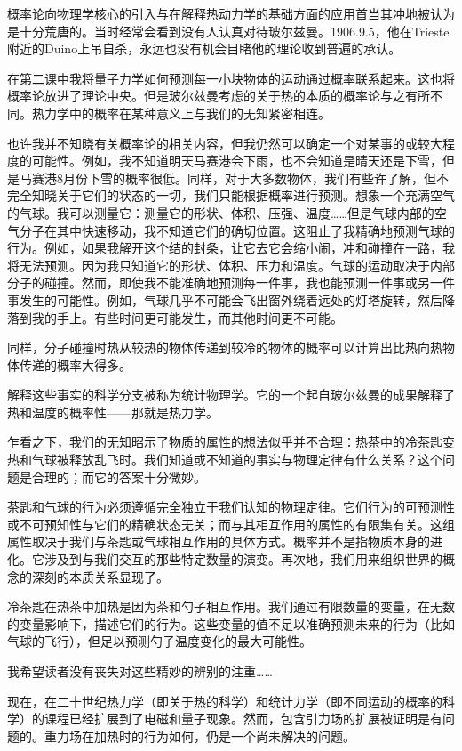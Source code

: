    概率论向物理学核心的引入与在解释热动力学的基础方面的应用首当其冲地被认为是十分荒唐的。当时经常会看到没有人认真对待玻尔兹曼。1906.9.5，他在Trieste附近的Duino上吊自杀，永远也没有机会目睹他的理论收到普遍的承认。

   在第二课中我将量子力学如何预测每一小块物体的运动通过概率联系起来。这也将概率论放进了理论中央。但是玻尔兹曼考虑的关于热的本质的概率论与之有所不同。热力学中的概率在某种意义上与我们的无知紧密相连。

   也许我并不知晓有关概率论的相关内容，但我仍然可以确定一个对某事的或较大程度的可能性。例如，我不知道明天马赛港会下雨，也不会知道是晴天还是下雪，但是马赛港8月份下雪的概率很低。同样，对于大多数物体，我们有些许了解，但不完全知晓关于它们的状态的一切，我们只能根据概率进行预测。想象一个充满空气的气球。我可以测量它：测量它的形状、体积、压强、温度……但是气球内部的空气分子在其中快速移动，我不知道它们的确切位置。这阻止了我精确地预测气球的行为。例如，如果我解开这个结的封条，让它去它会缩小闹，冲和碰撞在一路，我将无法预测。因为我只知道它的形状、体积、压力和温度。气球的运动取决于内部分子的碰撞。然而，即使我不能准确地预测每一件事，我也能预测一件事或另一件事发生的可能性。例如，气球几乎不可能会飞出窗外绕着远处的灯塔旋转，然后降落到我的手上。有些时间更可能发生，而其他时间更不可能。

   同样，分子碰撞时热从较热的物体传递到较冷的物体的概率可以计算出比热向热物体传递的概率大得多。

   解释这些事实的科学分支被称为统计物理学。它的一个起自玻尔兹曼的成果解释了热和温度的概率性——那就是热力学。

   乍看之下，我们的无知昭示了物质的属性的想法似乎并不合理：热茶中的冷茶匙变热和气球被释放乱飞时。我们知道或不知道的事实与物理定律有什么关系？这个问题是合理的；而它的答案十分微妙。

   茶匙和气球的行为必须遵循完全独立于我们认知的物理定律。它们行为的可预测性或不可预知性与它们的精确状态无关；而与其相互作用的属性的有限集有关。这组属性取决于我们与茶匙或气球相互作用的具体方式。概率并不是指物质本身的进化。它涉及到与我们交互的那些特定数量的演变。再次地，我们用来组织世界的概念的深刻的本质关系显现了。

   冷茶匙在热茶中加热是因为茶和勺子相互作用。我们通过有限数量的变量，在无数的变量影响下，描述它们的行为。这些变量的值不足以准确预测未来的行为（比如气球的飞行），但足以预测勺子温度变化的最大可能性。

   我希望读者没有丧失对这些精妙的辨别的注重……

   现在，在二十世纪热力学（即关于热的科学）和统计力学（即不同运动的概率的科学）的课程已经扩展到了电磁和量子现象。然而，包含引力场的扩展被证明是有问题的。重力场在加热时的行为如何，仍是一个尚未解决的问题。

